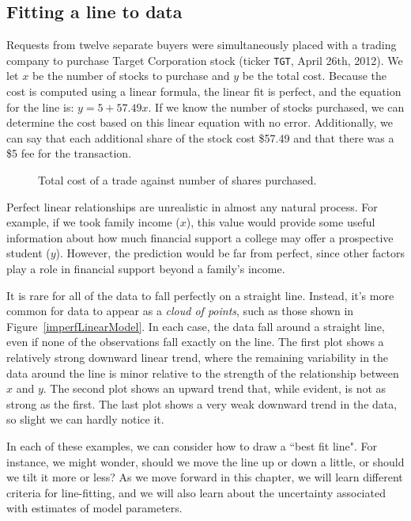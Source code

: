 \subsection{Fitting a line to data}
Requests from twelve separate buyers were simultaneously placed with a trading company to purchase Target Corporation stock (ticker \texttt{TGT}, April 26th, 2012).  We let $x$ be the number of stocks to purchase and $y$ be the total cost.  Because the cost is computed using a linear formula, the linear fit is perfect, and the equation for the line is: $ y = 5 + 57.49x$.
If we know the number of stocks purchased, we can determine the cost based on this linear equation with no error.  Additionally, we can say that each additional share of the stock cost \$57.49 and that there was a \$5 fee for the transaction.

\begin{figure}[h]
  \centering
  \caption{Total cost of a trade against number of shares purchased.}
  \label{perfLinearModel}
\end{figure}

\D{\newpage}

Perfect linear relationships are unrealistic in almost any natural process. For example, if we took family income ($x$), this value would provide some useful information about how much financial support a college may offer a prospective student ($y$). However, the prediction would be far from perfect, since other factors play a role in financial support beyond a family's income.

It is rare for all of the data to fall perfectly on a straight line.  Instead, it's more common for data to appear as a \emph{cloud of points}, such as those shown in Figure~\ref{imperfLinearModel}.  In each case, the data fall around a straight line, even if none of the observations fall exactly on the line. The first plot shows a relatively strong downward linear trend, where the remaining variability in the data around the line is minor relative to the strength of the relationship between $x$ and $y$. The second plot shows an upward trend that, while evident, is not as strong as the first. The last plot shows a very weak downward trend in the data, so slight we can hardly notice it. 

In each of these examples, we can consider how to draw a ``best fit line".   For instance, we might wonder, should we move the line up or down a little, or should we tilt it more or less? As we move forward in this chapter, we will learn different criteria for line-fitting, and we will also learn about the uncertainty associated with estimates of model parameters.

